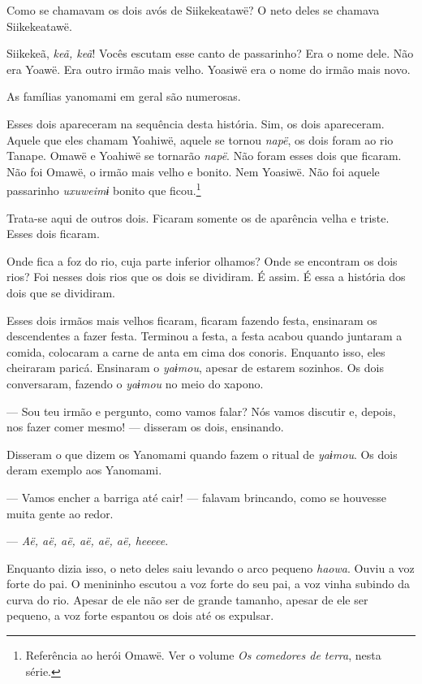 Como se chamavam os dois avós de Siikekeatawë? O neto deles se chamava
Siikekeatawë. 

Siikekeã, \textit{keã, keã}! Vocês escutam esse canto de passarinho? Era o
nome dele. Não era Yoawë. Era outro irmão mais velho. Yoasiwë era o nome
do irmão mais novo. 

As famílias yanomami em geral são numerosas. 

Esses dois apareceram na sequência desta história. Sim, os dois
apareceram. Aquele que eles chamam Yoahiwë, aquele se
tornou \textit{napë}, os dois foram ao rio Tanape. Omawë e Yoahiwë se
tornarão \textit{napë}. Não foram esses dois que ficaram. Não foi Omawë, o
irmão mais velho e bonito. Nem Yoasiwë. Não foi aquele
passarinho \textit{uxuweimɨ} bonito que ficou.\footnote{Referência ao herói Omawë. 
Ver o volume \textit{Os comedores de terra}, nesta série.} 

Trata-se aqui de outros dois. Ficaram somente os de aparência velha e triste. Esses dois ficaram.

Onde fica a foz do rio, cuja parte inferior olhamos? Onde se encontram
os dois rios? Foi nesses dois rios que os dois se dividiram. É assim. É essa 
a história dos dois que se dividiram. 

Esses dois irmãos mais velhos ficaram, ficaram fazendo festa, ensinaram
os descendentes a fazer festa. Terminou a festa, a festa acabou quando
juntaram a comida, colocaram a carne de anta em cima dos conoris.
Enquanto isso, eles cheiraram paricá. Ensinaram o \textit{yaɨmou}, 
apesar de estarem sozinhos. Os dois conversaram, fazendo o \textit{yaɨmou} no meio do xapono. 

--- Sou teu irmão e pergunto, como vamos falar? Nós vamos discutir e,
depois, nos fazer comer mesmo! --- disseram os dois, ensinando. 

Disseram o que dizem os Yanomami quando fazem o ritual de \textit{yaɨmou}.
Os dois deram exemplo aos Yanomami. 

--- Vamos encher a barriga até cair! --- falavam brincando, como se
houvesse muita gente ao redor. 

--- \textit{Aë, aë, aë, aë, aë, aë, heeeee}. 

Enquanto dizia isso, o neto deles saiu levando o arco pequeno \textit{haowa}.
Ouviu a voz forte do pai. O menininho escutou a voz forte do seu pai, a
voz vinha subindo da curva do rio. Apesar de ele não ser de grande
tamanho, apesar de ele ser pequeno, a voz forte espantou os dois até os
expulsar. 

